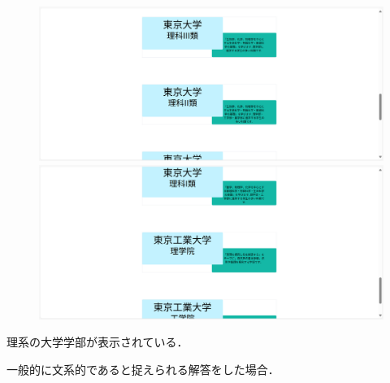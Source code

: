 \documentclass[a4j, titlepage]{jarticle}
\begin{document}
\begin{figure}[h]
  \centering
\includegraphics[scale=0.20]{dousakekka-7.png}
\includegraphics[scale=0.20]{dousakekka-8.png}
\end{figure}

理系の大学学部が表示されている．

一般的に文系的であると捉えられる解答をした場合．
\end{document}
